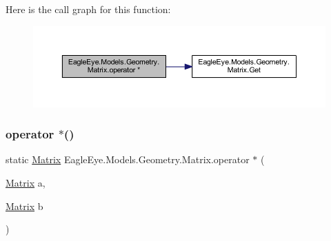 Here is the call graph for this function\+:\nopagebreak
\begin{figure}[H]
\begin{center}
\leavevmode
\includegraphics[width=350pt]{class_eagle_eye_1_1_models_1_1_geometry_1_1_matrix_a44614ac72efc9134ff0cf4e35f8ae343_cgraph}
\end{center}
\end{figure}
\mbox{\label{class_eagle_eye_1_1_models_1_1_geometry_1_1_matrix_a0bf6ba2c5b65b9f438a11908282c2a0c}} 
\subsubsection{\texorpdfstring{operator $\ast$()}{operator *()}\hspace{0.1cm}{\footnotesize\ttfamily [2/4]}}
{\footnotesize\ttfamily static \mbox{\hyperlink{class_eagle_eye_1_1_models_1_1_geometry_1_1_matrix}{Matrix}} Eagle\+Eye.\+Models.\+Geometry.\+Matrix.\+operator $\ast$ (\begin{DoxyParamCaption}\item[{\mbox{\hyperlink{class_eagle_eye_1_1_models_1_1_geometry_1_1_matrix}{Matrix}}}]{a,  }\item[{\mbox{\hyperlink{class_eagle_eye_1_1_models_1_1_geometry_1_1_matrix}{Matrix}}}]{b }\end{DoxyParamCaption})\hspace{0.3cm}{\ttfamily [static]}}

